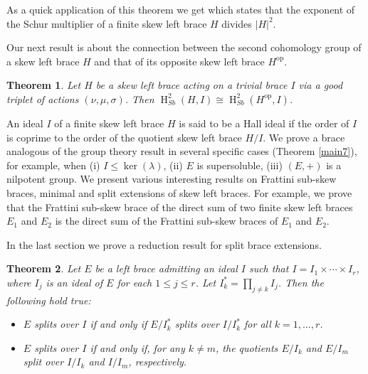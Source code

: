 \documentclass[11pt]{amsart}
\theoremstyle{thrm}
\theoremstyle{plain}
\newtheorem{thm}{Theorem}[section]
\theoremstyle{definition}
\newcommand{\Ho}{\operatorname{H} }
\newcommand{\Ker}{\operatorname{ker} }
\numberwithin{equation}{section}
\newcommand{\op}{\operatorname{op} }
\begin{document}
As a quick application of this theorem we get \cite[Theorem 2.2]{LV24} which states that the exponent of the Schur multiplier of a finite skew left brace $H$ divides $|H|^2$. 


Our next result is about the connection between the  second cohomology group of a skew left brace $H$ and that of its opposite skew left brace $H^{\op}$.

\begin{thm}
Let $H$ be a skew left brace acting on a  trivial brace $I$ via a good triplet of actions $(\nu, \mu, \sigma)$. Then $\Ho^2_{Sb}(H, I) \cong \Ho^2_{Sb}(H^{\op}, I)$. 
\end{thm}



An ideal $I$ of a finite skew left brace $H$  is said to be a Hall ideal if the order of $I$ is coprime to the order of the quotient skew left brace $H/I$. We prove a brace analogous of the group theory result \cite[9.1.2]{BEJP24} in several specific cases (Theorem \ref{main7}), for example,  when (i) $I \le \Ker(\lambda)$, (ii)  $E$ is supersoluble, (iii) $(E, +)$ is a nilpotent group. We present various  interesting results on Frattini  sub-skew braces, minimal and split extensions of skew left braces. For example, we prove that the Frattini sub-skew  brace of the direct sum of two finite skew left braces $E_1$ and $E_2$ is the direct sum of the Frattini sub-skew braces of $E_1$ and $E_2$.

In the last section we prove a reduction result for split  brace extensions.
\begin{thm}\label{thm1}
	 Let $E$ be a left brace  admitting an ideal  $I$ such that $I = I_1 \times \cdots \times I_r$, where  $I_j$ is an ideal of $E$ for each $1 \leq j \leq r$. Let $I_k^* = \prod_{j \neq k} I_j$. Then the following  hold true:
\begin{itemize}
	\item[(i)] $E$ splits over $I$ if and only if $E/I_k^*$ splits over $I/I_k^*$ for all $k = 1, \ldots, r$.
	\item[(ii)]  $E$ splits over $I$ if and only if, for any $k \neq m$, the quotients $E/I_k$ and $E/I_m$ split over $I/I_k$ and $I/I_m$, respectively.
\end{itemize}
\end{thm}
\end{document}
